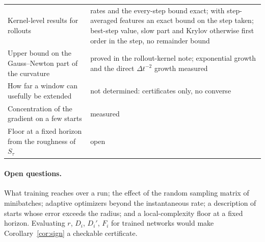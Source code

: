 \documentclass[11pt]{article}
\theoremstyle{definition}
\theoremstyle{remark}
\newcommand{\dt}{\Delta t}
\begin{document}
\begin{center}
\begin{tabular}{p{}p{}}
Kernel-level results for rollouts & rates and the every-step bound exact; with step-averaged features an exact bound on the step taken; best-step value, slow part and Krylov otherwise first order in the step, no remainder bound \\
Upper bound on the Gauss--Newton part of the curvature & proved in the rollout-kernel note; exponential growth and the direct $\dt^{-2}$ growth measured \\
How far a window can usefully be extended & not determined: certificates only, no converse \\
Concentration of the gradient on a few starts & measured \\
Floor at a fixed horizon from the roughness of $S_\tau$ & open \\
\bottomrule
\end{tabular}
\end{center}

\paragraph{Open questions.}
What training reaches over a run; the effect of the random sampling matrix of minibatches; adaptive optimizers beyond the instantaneous rate; a description of starts whose error exceeds the radius; and a local-complexity floor at a fixed horizon.
Evaluating $r$, $D_i$, $D_i'$, $F_i$ for trained networks would make Corollary~\ref{cor:sign} a checkable certificate.
\end{document}
